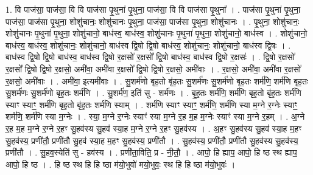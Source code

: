 \documentclass[17pt]{extarticle}
\begin{document}
1. वि पाज॑सा॒ पाज॑सा॒ वि वि पाज॑सा पृ॒थुना॑ पृ॒थुना॒ पाज॑सा॒ वि वि पाज॑सा पृ॒थुना᳚ । . पाज॑सा पृ॒थुना॑ पृ॒थुना॒ पाज॑सा॒ पाज॑सा पृ॒थुना॒ शोशु॑चानः॒ शोशु॑चानः पृ॒थुना॒ पाज॑सा॒ पाज॑सा पृ॒थुना॒ शोशु॑चानः । . पृ॒थुना॒ शोशु॑चानः॒ शोशु॑चानः पृ॒थुना॑ पृ॒थुना॒ शोशु॑चानो॒ बाध॑स्व॒ बाध॑स्व॒ शोशु॑चानः पृ॒थुना॑ पृ॒थुना॒ शोशु॑चानो॒ बाध॑स्व । . शोशु॑चानो॒ बाध॑स्व॒ बाध॑स्व॒ शोशु॑चानः॒ शोशु॑चानो॒ बाध॑स्व द्वि॒षो द्वि॒षो बाध॑स्व॒ शोशु॑चानः॒ शोशु॑चानो॒ बाध॑स्व द्वि॒षः । . बाध॑स्व द्वि॒षो द्वि॒षो बाध॑स्व॒ बाध॑स्व द्वि॒षो र॒क्षसो॑ र॒क्षसो᳚ द्वि॒षो बाध॑स्व॒ बाध॑स्व द्वि॒षो र॒क्षसः॑ । . द्वि॒षो र॒क्षसो॑ र॒क्षसो᳚ द्वि॒षो द्वि॒षो र॒क्षसो॒ अमी॑वा॒ अमी॑वा र॒क्षसो᳚ द्वि॒षो द्वि॒षो र॒क्षसो॒ अमी॑वाः । . र॒क्षसो॒ अमी॑वा॒ अमी॑वा र॒क्षसो॑ र॒क्षसो॒ अमी॑वाः । . अमी॑वा॒ इत्यमी॑वाः । . सु॒शर्म॑णो बृह॒तो बृ॑ह॒तः सु॒शर्म॑णः सु॒शर्म॑णो बृह॒तः शर्म॑णि॒ शर्म॑णि बृह॒तः सु॒शर्म॑णः सु॒शर्म॑णो बृह॒तः शर्म॑णि । . सु॒शर्म॑ण॒ इति॑ सु - शर्म॑णः । . बृ॒ह॒तः शर्म॑णि॒ शर्म॑णि बृह॒तो बृ॑ह॒तः शर्म॑णि स्याꣳ स्याꣳ॒॒ शर्म॑णि बृह॒तो बृ॑ह॒तः शर्म॑णि स्याम् । . शर्म॑णि स्याꣳ स्याꣳ॒॒ शर्म॑णि॒ शर्म॑णि स्या म॒ग्ने र॒ग्नेः स्याꣳ॒॒ शर्म॑णि॒ शर्म॑णि स्या म॒ग्नेः । . स्या॒ म॒ग्ने र॒ग्नेः स्याꣳ॑ स्या म॒ग्ने र॒ह म॒ह म॒ग्नेः स्याꣳ॑ स्या म॒ग्ने र॒हम् । . अ॒ग्ने र॒ह म॒ह म॒ग्ने र॒ग्ने र॒हꣳ सु॒हव॑स्य सु॒हव॑ स्या॒ह म॒ग्ने र॒ग्ने र॒हꣳ सु॒हव॑स्य । . अ॒हꣳ सु॒हव॑स्य सु॒हव॑ स्या॒ह म॒हꣳ सु॒हव॑स्य॒ प्रणी॑तौ॒ प्रणी॑तौ सु॒हव॑ स्या॒ह म॒हꣳ सु॒हव॑स्य॒ प्रणी॑तौ । . सु॒हव॑स्य॒ प्रणी॑तौ॒ प्रणी॑तौ सु॒हव॑स्य सु॒हव॑स्य॒ प्रणी॑तौ । . सु॒हव॒स्येति॑ सु - हव॑स्य । . प्रणी॑ता॒विति॒ प्र - नी॒तौ॒ । . आपो॒ हि ह्याप॒ आपो॒ हि ष्ठ स्थ ह्याप॒ आपो॒ हि ष्ठ । . हि ष्ठ स्थ हि हि ष्ठा म॑यो॒भुवो॑ मयो॒भुवः॒ स्थ हि हि ष्ठा म॑यो॒भुवः॑ । \newline
\end{document}
